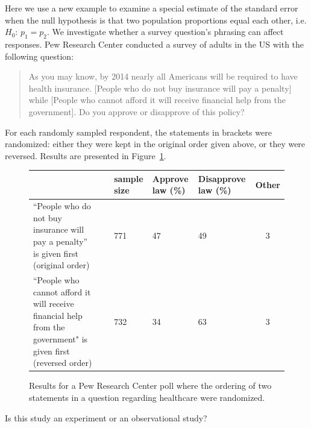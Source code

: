 Here we use a new example to examine a special estimate of the standard error when the null hypothesis is that two population proportions equal each other, i.e. $H_0$: $p_1 = p_2$. We investigate 
whether a survey question's phrasing can affect responses. Pew Research Center conducted a survey of adults in the US with the following question:
\begin{quote}
As you may know, by 2014 nearly all Americans will be required to have health insurance. [People who do not buy insurance will pay a penalty] while [People who cannot afford it will receive financial help from the government]. Do you approve or disapprove of this policy?
\end{quote}
For each randomly sampled respondent, the statements in brackets were randomized: either they were kept in the original order given above, or they were reversed. Results are presented in Figure~\ref{pewPollResultsForRandomizedStatementOrdering}.


\begin{figure}[h]
\centering
\begin{tabular}{p{50mm}c p{13mm}p{14mm}p{16.5mm}c}
	&\ & sample size & Approve law (\%)	& Disapprove law (\%)	& Other \\
\hline
``People who do not buy insurance will pay a penalty'' is given first (original order) \vspace{2.5mm}
	& & 771	& 47	& 49	& 3 \\
``People who cannot afford it will receive financial help from the government" is given first (reversed order) 
	& & 732	& 34	& 63	& 3 \\
\hline
\end{tabular}
\caption{Results for a Pew Research Center poll where the ordering of two statements in a question regarding healthcare were randomized.}
\label{pewPollResultsForRandomizedStatementOrdering}
\end{figure}



\begin{exercisewrap}
\begin{nexercise}
Is this study an experiment or an observational study?\footnotemark
\end{nexercise}
\end{exercisewrap}

